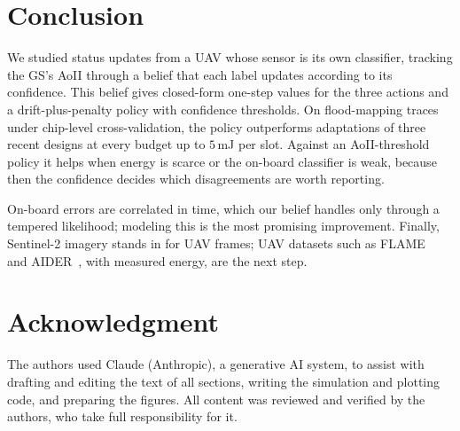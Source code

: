 \documentclass[conference]{IEEEtran}
\theoremstyle{remark}
\begin{document}
\section{Conclusion}\label{sec:concl}
We studied status updates from a UAV whose sensor is its own classifier, tracking the GS's AoII through a belief that each label updates according to its confidence. This belief gives closed-form one-step values for the three actions and a drift-plus-penalty policy with confidence thresholds. On flood-mapping traces under chip-level cross-validation, the policy outperforms adaptations of three recent designs at every budget up to $5$\,mJ per slot. Against an AoII-threshold policy it helps when energy is scarce or the on-board classifier is weak, because then the confidence decides which disagreements are worth reporting. 

On-board errors are correlated in time, which our belief handles only through a tempered likelihood; modeling this is the most promising improvement. Finally, Sentinel-2 imagery stands in for UAV frames; UAV datasets such as FLAME~\cite{shamsoshoara2021flame} and AIDER~\cite{kyrkou2020aider}, with measured energy, are the next step.

\section*{Acknowledgment}
The authors used Claude (Anthropic), a generative AI system, to assist with drafting and editing the text of all sections, writing the simulation and plotting code, and preparing the figures. All content was reviewed and verified by the authors, who take full responsibility for it.



\end{document}
